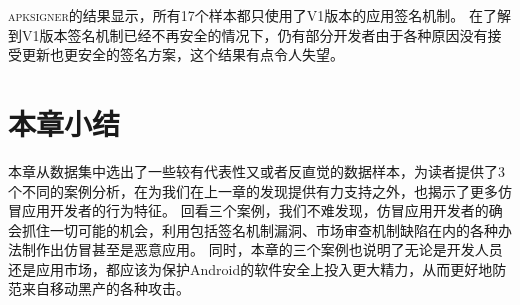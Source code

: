 \textsc{apksigner}的结果显示，所有17个样本都只使用了V1版本的应用签名机制。
在了解到V1版本签名机制已经不再安全的情况下，仍有部分开发者由于各种原因没有接受更新也更安全的签名方案，这个结果有点令人失望。

\section{本章小结}
本章从数据集中选出了一些较有代表性又或者反直觉的数据样本，为读者提供了3个不同的案例分析，在为我们在上一章的发现提供有力支持之外，也揭示了更多仿冒应用开发者的行为特征。
回看三个案例，我们不难发现，仿冒应用开发者的确会抓住一切可能的机会，利用包括签名机制漏洞、市场审查机制缺陷在内的各种办法制作出仿冒甚至是恶意应用。
同时，本章的三个案例也说明了无论是开发人员还是应用市场，都应该为保护Android的软件安全上投入更大精力，从而更好地防范来自移动黑产的各种攻击。
